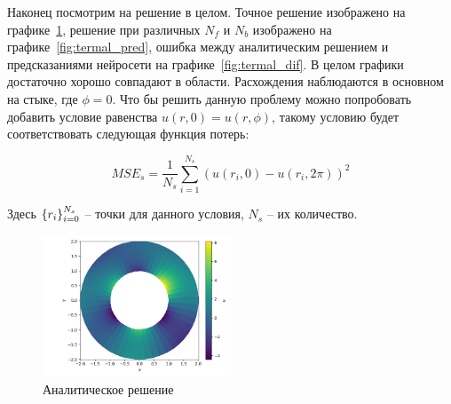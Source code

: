 \documentclass[a4paper,14pt]{extarticle} %
\begin{document}

% 

Наконец посмотрим на решение в целом. Точное решение изображено на графике~\ref{fig:termal_analit}, решение при различных $N_f$ и $N_b$ изображено на графике~\ref{fig:termal_pred}, ошибка между аналитическим решением и предсказаниями нейросети на графике~\ref{fig:termal_dif}. В целом графики достаточно хорошо совпадают в области. Расхождения наблюдаются в основном на стыке, где $\phi=0$. Что бы решить данную проблему можно попробовать добавить условие равенства $u(r, 0) = u(r, \phi)$, такому условию будет соответствовать следующая функция потерь:

\begin{equation}
    MSE_s = \frac{1}{N_s}\sum_{i=1}^{N_s} (u(r_i, 0) - u(r_i, 2\pi))^2
\end{equation}

Здесь ${\left\{ r_i \right\}}_{i=0}^{N_s}$ -- точки для данного условия, $N_s$ -- их количество.

\begin{figure}[ht]
    \center
    \includegraphics[width=0.5\textwidth]{../plots/termal/solut analit.png}
    \caption{Аналитическое решение}
    \label{fig:termal_analit}
\end{figure}
\end{document}

